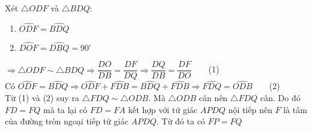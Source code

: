 \documentclass[12pt,a4paper]{article}
\begin{document}
Xét $\triangle{ODF}$ và $\triangle{BDQ}$:
\begin{enumerate}[ ]
	\item $\widehat{ODF}=\widehat{BDQ}$
	\item $\widehat{DOF}=\widehat{DBQ}=90^{\circ}$
\end{enumerate} 
$\Rightarrow\triangle{ODF}\sim\triangle{BDQ}\Rightarrow\dfrac{DO}{DB}=\dfrac{DF}{DQ}\Rightarrow\dfrac{DQ}{DB}=\dfrac{DF}{DO}\qquad$(1)\\

Có $\widehat{ODF}=\widehat{BDQ}\Rightarrow\widehat{ODF}+\widehat{FDB}=\widehat{BDQ}+\widehat{FDB}\Rightarrow\widehat{FDQ}=\widehat{ODB}\qquad$(2)\\

Từ (1) và (2) suy ra $\triangle{FDQ}\sim\triangle{ODB}$. Mà $\triangle{ODB}$ cân nên $\triangle{FDQ}$ cân. Do đó $FD=FQ$ mà ta lại có $FD=FA$ kết hợp với tứ giác $APDQ$ nội tiếp nên $F$ là tâm của đường tròn ngoại tiếp tứ giác $APDQ$. Từ đó ta có $FP=FQ$
\end{document}
